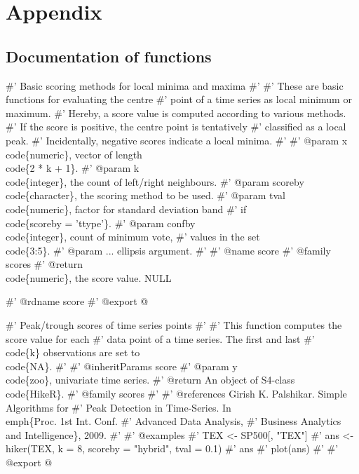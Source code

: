 \documentclass[a4paper]{article}
\begin{document}
\section{Appendix}
\label{S4}

\subsection{Documentation of functions}

\nwenddocs{}\endmoddef
#' Basic scoring methods for local minima and maxima
#'
#' These are basic functions for evaluating the centre
#' point of a time series as local minimum or maximum.
#' Hereby, a score value is computed according to various methods.
#' If the score is positive, the centre point is tentatively
#' classified as a local peak.
#' Incidentally, negative scores indicate a local minima.
#'
#' @param x \\code\{numeric\}, vector of length \\code\{2 * k + 1\}.
#' @param k \\code\{integer\}, the count of left/right neighbours.
#' @param scoreby \\code\{character\}, the scoring method to be used.
#' @param tval \\code\{numeric\}, factor for standard deviation band
#' if \\code\{scoreby = 'ttype'\}.
#' @param confby \\code\{integer\}, count of minimum vote,
#' values in the set \\code\{3:5\}.
#' @param ... ellipsis argument.
#'
#' @name score
#' @family scores
#' @return \\code\{numeric\}, the score value.
NULL

#' @rdname score
#' @export
\nwendcode{}@

\nwenddocs{}\endmoddef
#' Peak/trough scores of time series points
#'
#' This function computes the score value for each
#' data point of a time series. The first and last
#' \\code\{k\} observations are set to \\code\{NA\}.
#'
#' @inheritParams score
#' @param y \\code\{zoo\}, univariate time series.
#' @return An object of S4-class \\code\{HikeR\}.
#' @family scores
#'
#' @references Girish K. Palshikar. Simple Algorithms for
#' Peak Detection in Time-Series. In \\emph\{Proc. 1st Int. Conf.
#' Advanced Data Analysis,
#' Business Analytics and Intelligence\}, 2009.
#'
#' @examples
#' TEX <- SP500[, "TEX"]
#' ans <- hiker(TEX, k = 8, scoreby = "hybrid", tval = 0.1)
#' ans
#' plot(ans)
#'
#' @export
\nwendcode{}@
\end{document}
